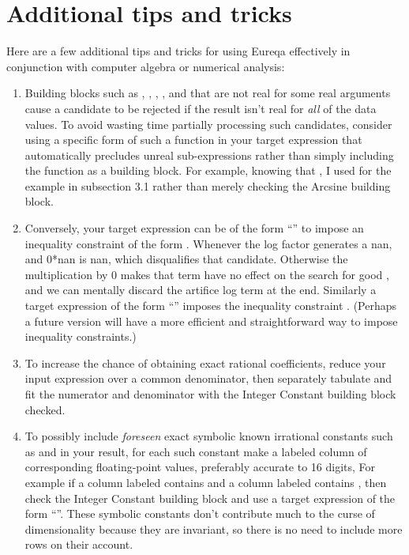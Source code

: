 \documentclass[12pt,english]{article}
\begin{document}
\section{Additional tips and tricks}

Here are a few additional tips and tricks for using Eureqa effectively
in conjunction with computer algebra or numerical analysis:\vspace{-5pt}

\begin{enumerate}
\item Building blocks such as , ,
, , and 
that are not real for some real arguments cause a candidate to be
rejected if the result isn't real for \textsl{all} of the data values.
To avoid wasting time partially processing such candidates, consider
using a specific form of such a function in your target expression
that automatically precludes unreal sub-expressions rather than simply
including the function as a building block. For example, knowing that
, I used  for the example
in subsection 3.1 rather than merely checking the Arcsine building
block. \vspace{-5pt}

\item Conversely, your target expression can be of the form {}``''
to impose an inequality constraint of the form . Whenever
 the log factor generates a nan, and 0{*}nan is nan, which
disqualifies that candidate. Otherwise the multiplication by 0 makes
that term have no effect on the search for good , and we can
mentally discard the artifice log term at the end. Similarly a target
expression of the form {}``''
imposes the inequality constraint . (Perhaps a
future version will have a more efficient and straightforward way
to impose inequality constraints.)\vspace{-5pt}

\item To increase the chance of obtaining exact rational coefficients, reduce
your input expression over a common denominator, then separately tabulate
and fit the numerator and denominator with the \textsf{Integer Constant}
building block checked.\vspace{-5pt}

\item To possibly include \textsl{foreseen} exact symbolic known irrational
constants such as  and  in your result, for each
such constant make a labeled column of corresponding floating-point
values, preferably accurate to 16 digits, For example if a column
labeled  contains  and a column labeled
 contains , then check the \textsf{Integer
Constant} building block and use a target expression of the form {}``''.
These symbolic constants don't contribute much to the curse of dimensionality
because they are invariant, so there is no need to include more rows
on their account.\vspace{-5pt}


\end{enumerate}
\end{document}
